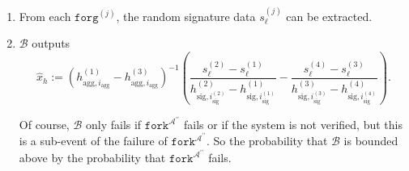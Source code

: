 \documentclass{iacrtrans}
\theoremstyle{definition}
\numberwithin{theorem}{subsection}
\numberwithin{lemma}{theorem}
\newcommand{\adversary}{\mathcal{A}}
\begin{document}
\begin{description}
\begin{enumerate}
\item From each $\texttt{forg}^{(j)}$, the random signature data $s_{\ell}^{(j)}$ can be extracted.

\item $\mathcal{B}$ outputs \[\widehat{x}_h := (h_{\text{agg}, i_{\text{agg}}}^{(1)} - h_{\text{agg}, i_{\text{agg}}}^{(3)})^{-1}\left(\frac{s_\ell^{(2)} - s_\ell^{(1)}}{h_{\text{sig}, i_{\text{sig}}^{(2)}}^{(2)} -h_{\text{sig}, i_{\text{sig}}^{(1)}}^{(1)}} -  \frac{s_\ell^{(4)} - s_\ell^{(3)}}{h_{\text{sig}, i_{\text{sig}}^{(3)}}^{(3)} -h_{\text{sig}, i_{\text{sig}}^{(4)}}^{(4)}}\right). \]

Of course, $\mathcal{B}$ only fails if $\texttt{fork}^{\adversary^{\prime \prime}}$ fails or if the system is not verified, but this is a sub-event of the failure of $\texttt{fork}^{\adversary^{\prime \prime}}$. So the probability that $\mathcal{B}$ is bounded above by the probability that $\texttt{fork}^{\adversary^{\prime \prime}}$ fails.

%
\end{enumerate}

\end{description}










\end{document}
